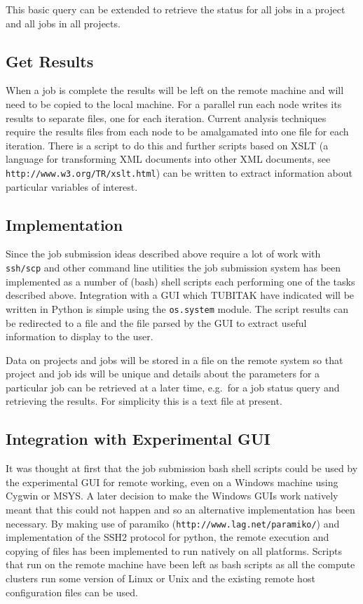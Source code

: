 This basic query can be extended to retrieve the status for all jobs in a project and all jobs in all projects.

\subsection{Get Results}

When a job is complete the results will be left on the remote machine and will need to be copied to the local machine. For a parallel run each node writes its results to separate files, one for each iteration. Current analysis techniques require the results files from each node to be amalgamated into one file for each iteration. There is a script to do this and further scripts based on XSLT (a language for transforming XML documents into other XML documents, see \verb+http://www.w3.org/TR/xslt.html+) can be written to extract information about particular variables of interest.

\subsection{Implementation}

Since the job submission ideas described above require a lot of work with \texttt{ssh/scp} and other command line utilities the job submission system has been implemented as a number of (bash) shell scripts each performing one of the tasks described above. Integration with a GUI which TUBITAK have indicated will be written in Python is simple using the \texttt{os.system} module. The script results can be redirected to a file and the file parsed by the GUI to extract useful information to display to the user.

Data on projects and jobs will be stored in a file on the remote system so that project and job ids will be unique and details about the parameters for a particular job can be retrieved at a later time, e.g.\ for a job status query and retrieving the results. For simplicity this is a text file at present.

\subsection{Integration with Experimental GUI}

It was thought at first that the job submission bash shell scripts could be used by the experimental GUI for remote working, even on a Windows machine using Cygwin or MSYS. A later decision to make the Windows GUIs work natively meant that this could not happen and so an alternative implementation has been necessary. By making use of paramiko (\verb+http://www.lag.net/paramiko/+) and implementation of the SSH2 protocol for python, the remote execution and copying of files has been implemented to run natively on all platforms.  Scripts that run on the remote machine have been left as bash scripts as all the compute clusters run some version of Linux or Unix and the existing remote host configuration files can be used. 

